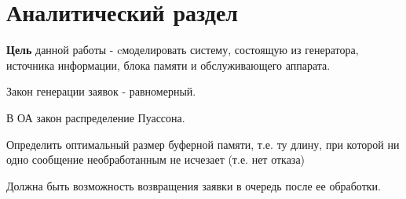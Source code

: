 \chapter{Аналитический раздел}

\textbf{Цель} данной работы - cмоделировать систему, состоящую из генератора, источника информации, блока памяти и обслуживающего аппарата. 

Закон генерации заявок - равномерный. 

В ОА закон распределение Пуассона. 

Определить оптимальный размер буферной памяти, т.е. ту длину, при которой ни одно сообщение необработанным не исчезает (т.е. нет отказа) 

Должна быть возможность возвращения заявки в очередь после ее обработки. 